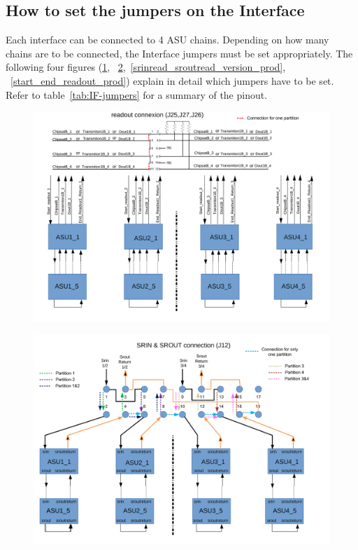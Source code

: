 \subsection{How to set the jumpers on the
  Interface}\label{sec:interface-jumpers}
Each interface can be connected to 4 ASU chains. Depending on how many chains
are to be connected, the Interface jumpers must be set appropriately. The
following four figures (\ref{readout_version_prod},
~\ref{srin_srout_version_prod},~\ref{srinread_sroutread_version_prod},
~\ref{start_end_readout_prod}) explain in detail which jumpers have to be
set. Refer to table~\ref{tab:IF-jumpers} for a summary of the pinout.
\begin{figure}[H] \centering
\includegraphics[width=0.8\linewidth]{readout_version_prod}
  \caption{}\label{readout_version_prod}
\end{figure}
\begin{figure}[H] \centering
\includegraphics[width=0.8\linewidth]{srin_srout_version_prod}
  \caption{}\label{srin_srout_version_prod}
\end{figure}
